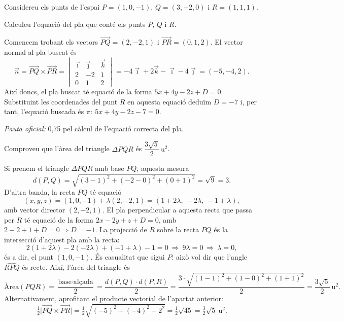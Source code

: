 Considereu els punts de l'espai $P=(1,0,-1)$, $Q=(3,-2,0)$ i $R=(1,1,1)$.

\begin{apartats}

Calculeu l'equació del pla que conté els punts $P$, $Q$ i $R$.

\begin{solucio}
Comencem trobant els vectors $\overrightarrow{PQ}=(2,-2,1)$ i $\overrightarrow{PR}=(0,1,2)$.
El vector normal al pla buscat és
\[
\vec n=\overrightarrow{PQ}\times\overrightarrow{PR}
=\begin{vmatrix}\vec\imath&\vec\jmath&\vec k\\2&-2&1\\0&1&2\end{vmatrix}
=-4\vec\imath+2\vec k-\vec\imath-4\vec\jmath=(-5,-4,2).
\]
Així doncs, el pla buscat té equació de la forma $5x+4y-2z+D=0$. Substituint les coordenades
del punt $R$ en aquesta equació deduïm $D=-7$ i, per tant, l'equació buscada és
$\pi\colon\ 5x+4y-2z-7=0$.

\textit{Pauta oficial:} 0,75 pel càlcul de l'equació correcta del pla.
\end{solucio}

Comproveu que l'àrea del triangle $\Delta PQR$ és $\dfrac{3\sqrt5}{2}\,\text{u}^2$.

\begin{solucio}
Si prenem el triangle $\Delta PQR$ amb base $PQ$, aquesta mesura
\[
d(P,Q)=\sqrt{(3-1)^2+(-2-0)^2+(0+1)^2}=\sqrt9=3.
\]
D'altra banda, la recta $PQ$ té equació
\[
(x,y,z)=(1,0,-1)+\lambda(2,-2,1)=(1+2\lambda,\,-2\lambda,\,-1+\lambda),
\]
amb vector director $(2,-2,1)$. El pla perpendicular a aquesta recta que passa per $R$ té
equació de la forma $2x-2y+z+D=0$, amb $2-2+1+D=0\Rightarrow D=-1$. La projecció de $R$
sobre la recta $PQ$ és la intersecció d'aquest pla amb la recta:
\[
2(1+2\lambda)-2(-2\lambda)+(-1+\lambda)-1=0\ \Rightarrow\ 9\lambda=0\ \Rightarrow\ \lambda=0,
\]
és a dir, el punt $(1,0,-1)$. És casualitat que sigui $P$: això vol dir que l'angle
$\widehat{RPQ}$ és recte. Així, l'àrea del triangle és
\[
\text{Àrea}(PQR)=\frac{\text{base}\cdot\text{alçada}}{2}=\frac{d(P,Q)\cdot d(P,R)}{2}
=\frac{3\cdot\sqrt{(1-1)^2+(1-0)^2+(1+1)^2}}{2}=\frac{3\sqrt5}{2}\ \text{u}^2.
\]
Alternativament, aprofitant el producte vectorial de l'apartat anterior:
\[
\tfrac12\big|\overrightarrow{PQ}\times\overrightarrow{PR}\big|=\tfrac12\sqrt{(-5)^2+(-4)^2+2^2}
=\tfrac12\sqrt{45}=\tfrac32\sqrt5\ \text{u}^2.
\]


\end{solucio}
\end{apartats}
